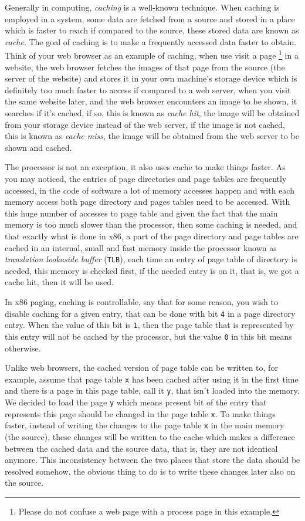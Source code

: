 Generally in computing, \emph{caching} is a well-known technique. When
caching is employed in a system, some data are fetched from a source and
stored in a place which is faster to reach if compared to the source,
these stored data are known as \emph{cache}. The goal of caching is to
make a frequently accessed data faster to obtain. Think of your web
browser as an example of caching, when use visit a page \footnote{Please
  do not confuse a web page with a process page in this example.} in a
website, the web browser fetches the images of that page from the source
(the server of the website) and stores it in your own machine's storage
device which is definitely too much faster to access if compared to a
web server, when you visit the same website later, and the web browser
encounters an image to be shown, it searches if it's cached, if so, this
is known as \emph{cache hit}, the image will be obtained from your
storage device instead of the web server, if the image is not cached,
this is known as \emph{cache miss}, the image will be obtained from the
web server to be shown and cached.

The processor is not an exception, it also uses cache to make things
faster. As you may noticed, the entries of page directories and page
tables are frequently accessed, in the code of software a lot of memory
accesses happen and with each memory access both page directory and
pages tables need to be accessed. With this huge number of accesses to
page table and given the fact that the main memory is too much slower
than the processor, then some caching is needed, and that exactly what
is done in x86, a part of the page directory and page tables are cached
in an internal, small and fast memory inside the processor known as
\emph{translation lookaside buffer} (\lstinline!TLB!), each time an
entry of page table of directory is needed, this memory is checked
first, if the needed entry is on it, that is, we got a cache hit, then
it will be used.

In x86 paging, caching is controllable, say that for some reason, you
wish to disable caching for a given entry, that can be done with bit
\lstinline!4! in a page directory entry. When the value of this bit is
\lstinline!1!, then the page table that is represented by this entry
will not be cached by the processor, but the value \lstinline!0! in this
bit means otherwise.

Unlike web browsers, the cached version of page table can be written to,
for example, assume that page table \lstinline!x! has been cached after
using it in the first time and there is a page in this page table, call
it \lstinline!y!, that isn't loaded into the memory. We decided to load
the page \lstinline!y! which means present bit of the entry that
represents this page should be changed in the page table \lstinline!x!.
To make things faster, instead of writing the changes to the page table
\lstinline!x! in the main memory (the source), these changes will be
written to the cache which makes a difference between the cached data
and the source data, that is, they are not identical anymore. This
inconsistency between the two places that store the data should be
resolved somehow, the obvious thing to do is to write these changes
later also on the source.

